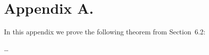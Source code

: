\documentclass[twoside,11pt]{article}
\begin{document}
\newpage

\appendix
\section*{Appendix A.}
\label{app:theorem}



In this appendix we prove the following theorem from
Section~6.2:

\ldots

\vskip 0.2in

\end{document}
